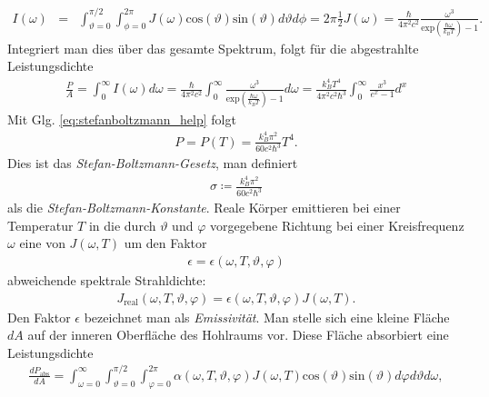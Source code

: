 \documentclass{book}
\renewcommand{\exp}{\text{exp}}
\renewcommand{\sin}{\text{sin}}
\renewcommand{\cos}{\text{cos}}
\begin{document}
%
\begin{eqnarray}
I\left(\omega\right) & = & \int_{\vartheta = 0}^{\pi/2}\int_{\phi = 0}^{2\pi}J\left(\omega\right)\cos\left(\vartheta\right)\sin\left(\vartheta\right)d\vartheta d\phi = 2\pi\frac{1}{2}J\left(\omega\right) = \frac{\hbar}{4\pi^2c^2}\frac{\omega^3}{\exp\left(\frac{\hbar\omega}{k_BT}\right) - 1}.
\end{eqnarray}
%
Integriert man dies über das gesamte Spektrum, folgt für die abgestrahlte Leistungsdichte
%
\begin{eqnarray}
\frac{P}{A} = \int_{0}^{\infty}I\left(\omega\right)d\omega = \frac{\hbar}{4\pi^2c^2}\int_{0}^{\infty}\frac{\omega^3}{\exp\left(\frac{\hbar\omega}{k_BT}\right) - 1}d\omega = \frac{k_B^4T^4}{4\pi^2c^2\hbar^3}\int_{0}^{\infty}\frac{x^3}{e^x - 1}d^x
\end{eqnarray}
%
Mit Glg. \eqref{eq:stefanboltzmann_help} folgt
%
\begin{eqnarray}
P = P\left(T\right) = \frac{k_B^4\pi^2}{60c^2\hbar^3}T^4.
\end{eqnarray}
%
Dies ist das \textit{Stefan-Boltzmann-Gesetz},  man definiert
%
\begin{eqnarray}
\sigma \coloneqq\frac{k_B^4\pi^2}{60c^2\hbar^3}
\end{eqnarray}
%
als die \textit{Stefan-Boltzmann-Konstante}. Reale Körper emittieren bei einer Temperatur $T$ in die durch $\vartheta$ und $\varphi$ vorgegebene Richtung bei einer Kreisfrequenz $\omega$ eine von $J\left(\omega, T\right)$ um den Faktor
%
\begin{eqnarray}
\epsilon = \epsilon\left(\omega, T, \vartheta, \varphi\right)
\end{eqnarray}
%
abweichende spektrale Strahldichte:
%
\begin{eqnarray}
J_{\text{real}}\left(\omega, T, \vartheta, \varphi\right) = \epsilon\left(\omega, T, \vartheta, \varphi\right)J\left(\omega, T\right).
\end{eqnarray}
%
Den Faktor $\epsilon$ bezeichnet man als \textit{Emissivität}. Man stelle sich eine kleine Fläche $dA$ auf der inneren Oberfläche des Hohlraums vor. Diese Fläche absorbiert eine Leistungsdichte
%
\begin{eqnarray}
\frac{dP_{\text{abs}}}{dA} = \int_{\omega = 0}^\infty\int_{\vartheta = 0}^{\pi/2}\int_{\varphi = 0}^{2\pi}\alpha\left(\omega, T, \vartheta, \varphi\right)J\left(\omega, T\right)\cos\left(\vartheta\right)\sin\left(\vartheta\right)d\varphi d\vartheta d\omega, 
\end{eqnarray}
\end{document}
